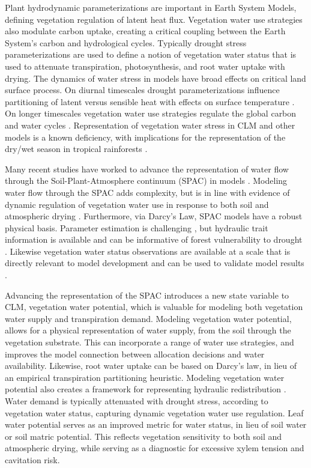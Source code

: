 \documentclass[draft,linenumbers]{agujournal}
\begin{document}
Plant hydrodynamic parameterizations are important in Earth System Models, defining vegetation regulation of latent heat flux.
Vegetation water use strategies also modulate carbon uptake, creating a critical coupling between the Earth System's carbon and hydrological cycles.
Typically drought stress parameterizations are used to define a notion of vegetation water status 
that is used to attenuate transpiration, photosynthesis, and root water uptake with drying.
The dynamics of water stress in models have broad effects on critical land surface process.
On diurnal timescales drought parameterizations influence partitioning of latent versus sensible heat with effects on surface temperature \citep{bonan2014}.
On longer timescales vegetation water use strategies regulate the global carbon and water cycles \citep{dekauwe2015}.
Representation of vegetation water stress in CLM and other models is a known deficiency, with implications for the representation of the dry/wet season in tropical rainforests \citep{powell2013,ukkola2016}.

Many recent studies have worked to advance the representation of water flow through the Soil-Plant-Atmosphere continuum (SPAC) in models \citep{xu2016,christoffersen2016,sperry2017}.
Modeling water flow through the SPAC adds complexity, but is in line with evidence of dynamic regulation of vegetation water use in response to both soil and atmospheric drying \citep{sperry2015}.
Furthermore, via Darcy's Law, SPAC models have a robust physical basis.
Parameter estimation is challenging \citep{drake2017}, but hydraulic trait information is available \citep{kattge2011,anderegg2015a} and can be informative of forest vulnerability to drought \citep{choat2012}.
Likewise vegetation water status observations are available at a scale that is directly relevant to model development \citep{konings2016,grant2016} and can be used to validate model results \citep{momen2017,konings2017b}.

Advancing the representation of the SPAC introduces a new state variable to CLM, vegetation water potential, 
which is valuable for modeling both vegetation water supply and transpiration demand.
Modeling vegetation water potential, allows for a physical representation of water supply, from the soil through the vegetation substrate.
This can incorporate a range of water use strategies, and improves the model connection between allocation decisions and water availability.
Likewise, root water uptake can be based on Darcy's law, in lieu of an empirical transpiration partitioning heuristic.
Modeling vegetation water potential also creates a framework for representing hydraulic redistribution \citep{lee2005}.
Water demand is typically attenuated with drought stress, according to vegetation water status, capturing dynamic vegetation water use regulation.
Leaf water potential serves as an improved metric for water status, in lieu of soil water or soil matric potential.
This reflects vegetation sensitivity to both soil and atmospheric drying, while serving as a diagnostic for excessive xylem tension and cavitation risk.
\end{document}
